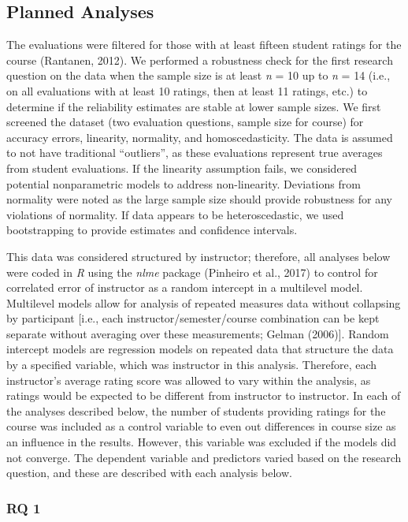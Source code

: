 \documentclass[
  man]{apa7}
\begin{document}
\hypertarget{planned-analyses}{%
\subsection{Planned Analyses}\label{planned-analyses}}

The evaluations were filtered for those with at least fifteen student
ratings for the course (Rantanen, 2012). We performed a robustness check
for the first research question on the data when the sample size is at
least \emph{n} = 10 up to \emph{n} = 14 (i.e., on all evaluations with at least 10
ratings, then at least 11 ratings, etc.) to determine if the reliability
estimates are stable at lower sample sizes. We first screened the
dataset (two evaluation questions, sample size for course) for accuracy
errors, linearity, normality, and homoscedasticity. The data is assumed
to not have traditional ``outliers'', as these evaluations represent true
averages from student evaluations. If the linearity assumption fails, we
considered potential nonparametric models to address non-linearity.
Deviations from normality were noted as the large sample size should
provide robustness for any violations of normality. If data appears to
be heteroscedastic, we used bootstrapping to provide estimates and
confidence intervals.

This data was considered structured by instructor; therefore, all
analyses below were coded in \emph{R} using the \emph{nlme} package
(Pinheiro et al., 2017) to control for correlated error of instructor as a
random intercept in a multilevel model. Multilevel models allow for
analysis of repeated measures data without collapsing by participant
{[}i.e., each instructor/semester/course combination can be kept separate
without averaging over these measurements; Gelman (2006){]}. Random
intercept models are regression models on repeated data that structure
the data by a specified variable, which was instructor in this analysis.
Therefore, each instructor's average rating score was allowed to vary
within the analysis, as ratings would be expected to be different from
instructor to instructor. In each of the analyses described below, the
number of students providing ratings for the course was included as a
control variable to even out differences in course size as an influence
in the results. However, this variable was excluded if the models did
not converge. The dependent variable and predictors varied based on the
research question, and these are described with each analysis below.

\hypertarget{rq-1}{%
\subsubsection{RQ 1}\label{rq-1}}
\end{document}
